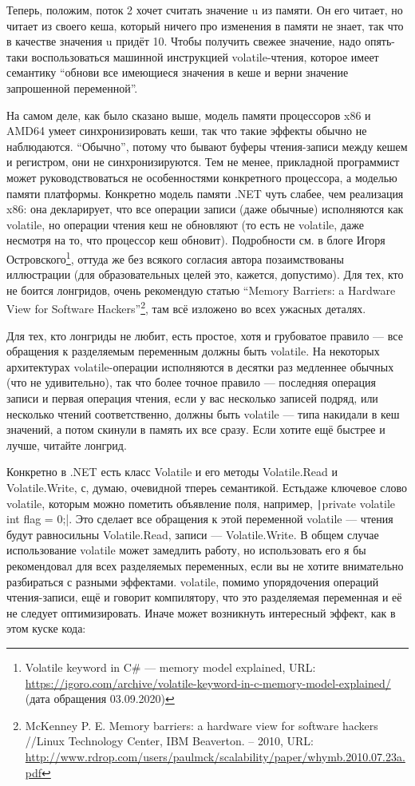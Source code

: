 \documentclass[a5paper]{article}
\begin{document}
Теперь, положим, поток 2 хочет считать значение u из памяти. Он его читает, но читает из своего кеша, который ничего про изменения в памяти не знает, так что в качестве значения u придёт 10. Чтобы получить свежее значение, надо опять-таки воспользоваться машинной инструкцией volatile-чтения, которое имеет семантику ``обнови все имеющиеся значения в кеше и верни значение запрошенной переменной''.

На самом деле, как было сказано выше, модель памяти процессоров x86 и AMD64 умеет синхронизировать кеши, так что такие эффекты обычно не наблюдаются. ``Обычно'', потому что бывают буферы чтения-записи между кешем и регистром, они не синхронизируются. Тем не менее, прикладной программист может руководствоваться не особенностями конкретного процессора, а моделью памяти платформы. Конкретно модель памяти .NET чуть слабее, чем реализация x86: она декларирует, что все операции записи (даже обычные) исполняются как volatile, но операции чтения кеш не обновляют (то есть не volatile, даже несмотря на то, что процессор кеш обновит). Подробности см. в блоге Игоря Островского\footnote{Volatile keyword in C\# --- memory model explained, URL: \url{https://igoro.com/archive/volatile-keyword-in-c-memory-model-explained/} (дата обращения 03.09.2020)}, оттуда же без всякого согласия автора позаимствованы иллюстрации (для образовательных целей это, кажется, допустимо). Для тех, кто не боится лонгридов, очень рекомендую статью ``Memory Barriers: a Hardware View for Software Hackers''\footnote{McKenney P. E. Memory barriers: a hardware view for software hackers //Linux Technology Center, IBM Beaverton. – 2010, URL: \url{http://www.rdrop.com/users/paulmck/scalability/paper/whymb.2010.07.23a.pdf}}, там всё изложено во всех ужасных деталях.

Для тех, кто лонгриды не любит, есть простое, хотя и грубоватое правило --- все обращения к разделяемым переменным должны быть volatile. На некоторых архитектурах volatile-операции исполняются в десятки раз медленнее обычных (что не удивительно), так что более точное правило --- последняя операция записи и первая операция чтения, если у вас несколько записей подряд, или несколько чтений соответственно, должны быть volatile --- типа накидали в кеш значений, а потом скинули в память их все сразу. Если хотите ещё быстрее и лучше, читайте лонгрид.

Конкретно в .NET есть класс Volatile и его методы Volatile.Read и Volatile.Write, с, думаю, очевидной тпереь семантикой. Естьдаже ключевое слово volatile, которым можно пометить объявление поля, например, \texttt|private volatile int flag = 0;|. Это сделает все обращения к этой переменной volatile --- чтения будут равносильны Volatile.Read, записи --- Volatile.Write. В общем случае использование volatile может замедлить работу, но использовать его я бы рекомендовал для всех разделяемых переменных, если вы не хотите внимательно разбираться с разными эффектами. volatile, помимо упорядочения операций чтения-записи, ещё и говорит компилятору, что это разделяемая переменная и её не следует оптимизировать. Иначе может возникнуть интересный эффект, как в этом куске кода:
\end{document}
